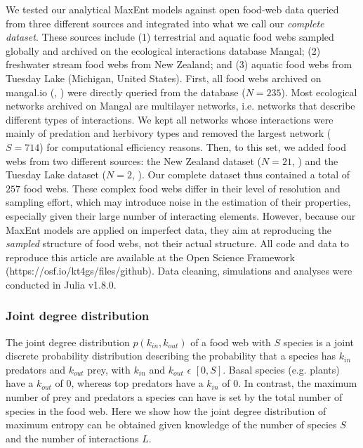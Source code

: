 We tested our analytical MaxEnt models against open food-web data queried from
three different sources and integrated into what we call our \textit{complete
dataset}. These sources include (1) terrestrial and aquatic food webs sampled
globally and archived on the ecological interactions database Mangal; (2)
freshwater stream food webs from New Zealand; and (3) aquatic food webs from
Tuesday Lake (Michigan, United States). First, all food webs archived on
mangal.io (\cite{Poisot2016Mangal}, \cite{Banville2021Mangal}) were directly
queried from the database ($N = 235$). Most ecological networks archived on
Mangal are multilayer networks, i.e. networks that describe different types of
interactions. We kept all networks whose interactions were mainly of predation
and herbivory types and removed the largest network ($S = 714$) for
computational efficiency reasons. Then, to this set, we added food webs from two
different sources: the New Zealand dataset ($N = 21$, \cite{Pomeranz2018Data})
and the Tuesday Lake dataset ($N = 2$, \cite{Cohen2003Ecological}). Our complete
dataset thus contained a total of $257$ food webs. These complex food webs
differ in their level of resolution and sampling effort, which may introduce
noise in the estimation of their properties, especially given their large number
of interacting elements. However, because our MaxEnt models are applied on
imperfect data, they aim at reproducing the \textit{sampled} structure of food
webs, not their actual structure. All code and data to reproduce this article
are available at the Open Science Framework (https://osf.io/kt4gs/files/github).
Data cleaning, simulations and analyses were conducted in Julia v1.8.0.

\subsubsection{Joint degree distribution} 

The joint degree distribution $p(k_{in},k_{out})$ of a food web with $S$ species
is a joint discrete probability distribution describing the probability that a
species has $k_{in}$ predators and $k_{out}$ prey, with $k_{in}$ and $k_{out}$
$\epsilon$ $[0, S]$. Basal species (e.g. plants) have a $k_{out}$ of $0$,
whereas top predators have a $k_{in}$ of $0$. In contrast, the maximum number of
prey and predators a species can have is set by the total number of species in
the food web. Here we show how the joint degree distribution of maximum entropy
can be obtained given knowledge of the number of species $S$ and the number of
interactions $L$.

